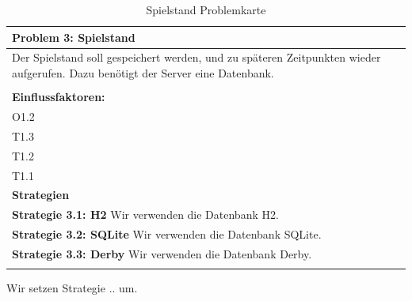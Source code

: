 \documentclass[fontsize=12pt,paper=a4,twoside]{scrartcl}
\begin{document}
\begin{table}[H]
    \centering
    \begin{tabular}{|p{15cm}|}
    \hline
          \textbf{Problem 3: Spielstand}  \\ \hline
	Der Spielstand soll gespeichert werden, und zu späteren Zeitpunkten wieder aufgerufen. Dazu benötigt der Server eine Datenbank. \\
         \\ \hline
          \textbf{Einflussfaktoren: } \\
	O1.2 \\
	T1.3 \\
	T1.2 \\
	T1.1 \\
          \hline
          \textbf{Strategien} \\ \hline
            {}          
           \label{strategie:3.1}     
          \textbf{Strategie 3.1: H2}  Wir verwenden die Datenbank H2. \\        
  {}          
           \label{strategie:3.2}              
          \textbf{Strategie 3.2: SQLite} Wir verwenden die Datenbank SQLite. \\
	 {}          
           \label{strategie:3.3}     
          \textbf{Strategie 3.3: Derby } Wir verwenden die Datenbank Derby. \\ 
	 \\ \hline
    \end{tabular}

    \caption{Spielstand Problemkarte}
    \label{tab:ProblemKarte3}
\end{table}
Wir setzen Strategie .. um. \\
\end{document}
